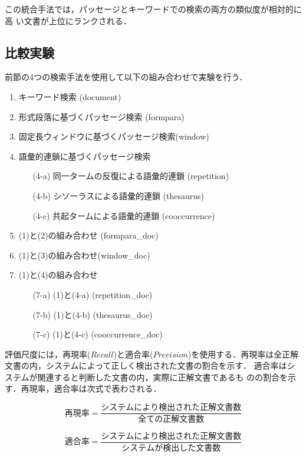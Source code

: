 この統合手法では，パッセージとキーワードでの検索の両方の類似度が相対的に高
い文書が上位にランクされる．

\subsection{比較実験}\label{subsec:experiments}
前節の4つの検索手法を使用して以下の組み合わせで実験を行う．

\begin{enumerate}
\item キーワード検索 (document)
\item 形式段落に基づくパッセージ検索 (formpara)
\item 固定長ウィンドウに基づくパッセージ検索(window)
\item 語彙的連鎖に基づくパッセージ検索
	\begin{enumerate}
	\item [(4-a)] 同一タームの反復による語彙的連鎖 (repetition)
	\item [(4-b)] シソーラスによる語彙的連鎖 (thesaurus)
	\item [(4-c)] 共起タームによる語彙的連鎖 (cooccurrence)
	\end{enumerate}
\item (1)と(2)の組み合わせ (formpara\_doc)
\item (1)と(3)の組み合わせ(window\_doc)
\item (1)と(4)の組み合わせ
	\begin{enumerate}
	\item [(7-a)] (1)と(4-a) (repetition\_doc)
	\item [(7-b)] (1)と(4-b) (thesaurus\_doc)
	\item [(7-c)] (1)と(4-c) (cooccurrence\_doc)
	\end{enumerate}
\end{enumerate}

評価尺度には，再現率($Recall$)と適合率($Precision$)を使用する．$再現
率$は全正解文書の内，システムによって正しく検出された文書の割合を示す．
$適合率$はシステムが関連すると判断した文書の内，実際に正解文書であるも
のの割合を示す．$再現率$，$適合率$は次式で表わされる．

\begin{equation}\label{equ:recall}
再現率 = \frac{システムにより検出された正解文書数}{全ての正解文書数}
\end{equation}

\begin{equation}\label{equ:precision}
適合率 = \frac{システムにより検出された正解文書数}{システムが検出した
文書数}
\end{equation}

